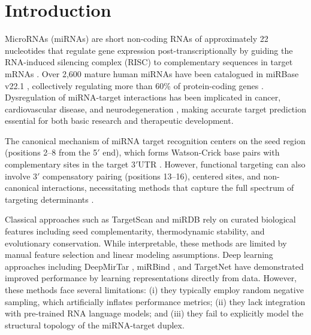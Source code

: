 \documentclass[unnumsec,webpdf,contemporary,large]{oup-authoring-template}
\begin{document}

\maketitle

\section{Introduction}

MicroRNAs (miRNAs) are short non-coding RNAs of approximately 22 nucleotides that regulate gene expression post-transcriptionally by guiding the RNA-induced silencing complex (RISC) to complementary sequences in target mRNAs \citep{bartel2018}. Over 2,600 mature human miRNAs have been catalogued in miRBase v22.1 \citep{kozomara2019}, collectively regulating more than 60\% of protein-coding genes \citep{friedman2009}. Dysregulation of miRNA-target interactions has been implicated in cancer, cardiovascular disease, and neurodegeneration \citep{rupaimoole2017}, making accurate target prediction essential for both basic research and therapeutic development.

The canonical mechanism of miRNA target recognition centers on the seed region (positions 2--8 from the 5$'$ end), which forms Watson-Crick base pairs with complementary sites in the target 3$'$UTR \citep{bartel2009}. However, functional targeting can also involve 3$'$ compensatory pairing (positions 13--16), centered sites, and non-canonical interactions, necessitating methods that capture the full spectrum of targeting determinants \citep{agarwal2015}.

Classical approaches such as TargetScan \citep{agarwal2015} and miRDB \citep{chen2020} rely on curated biological features including seed complementarity, thermodynamic stability, and evolutionary conservation. While interpretable, these methods are limited by manual feature selection and linear modeling assumptions. Deep learning approaches including DeepMirTar \citep{wen2018}, miRBind \citep{klimentova2022}, and TargetNet \citep{min2021} have demonstrated improved performance by learning representations directly from data. However, these methods face several limitations: (i) they typically employ random negative sampling, which artificially inflates performance metrics; (ii) they lack integration with pre-trained RNA language models; and (iii) they fail to explicitly model the structural topology of the miRNA-target duplex.
\end{document}
